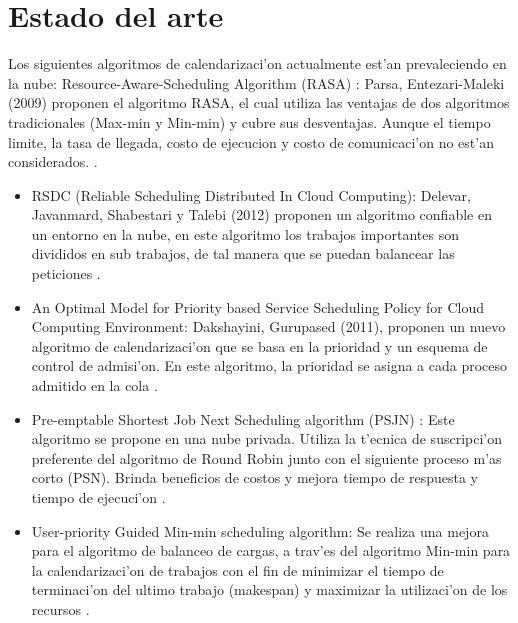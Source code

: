 \section*{Estado del arte}

Los siguientes algoritmos de calendarizaci'on actualmente est'an prevaleciendo en la nube:
Resource-Aware-Scheduling Algorithm (RASA) :  Parsa, Entezari-Maleki (2009) proponen el algoritmo RASA, el cual utiliza las ventajas de dos algoritmos tradicionales (Max-min y Min-min) y cubre sus desventajas. Aunque el tiempo limite, la tasa de llegada, costo de ejecucion y costo de comunicaci'on no est'an considerados. \cite{parsa2009rasa}.

\begin{itemize}
\item RSDC (Reliable Scheduling Distributed In Cloud Computing): Delevar, Javanmard, Shabestari y Talebi (2012) proponen un algoritmo confiable en un entorno en la nube, en este algoritmo los trabajos importantes son divididos en sub trabajos, de tal manera que se puedan balancear las peticiones \cite{delavar2012rsdc}.


\item An Optimal Model for Priority based Service Scheduling Policy for Cloud Computing Environment: Dakshayini, Gurupased (2011), proponen un nuevo algoritmo de calendarizaci'on que se basa en la prioridad y un esquema de control de admisi'on. En este algoritmo, la prioridad se asigna a cada proceso admitido en la cola \cite{dakshayini2011optimal}. 


\item Pre-emptable Shortest Job Next Scheduling algorithm (PSJN) :  Este algoritmo se propone en una nube privada. Utiliza la t'ecnica de suscripci'on preferente del algoritmo de Round Robin junto con el siguiente proceso m'as corto (PSN). Brinda beneficios de costos y mejora tiempo de respuesta y tiempo de ejecuci'on \cite{nishant}. 


\item User-priority Guided Min-min scheduling algorithm: Se realiza una mejora para el algoritmo de balanceo de cargas, a trav'es del algoritmo Min-min para la calendarizaci'on de trabajos con el fin de minimizar el tiempo de terminaci'on del ultimo trabajo (makespan) y maximizar la utilizaci'on de los recursos \cite{chen2013user}. 
\end{itemize}


